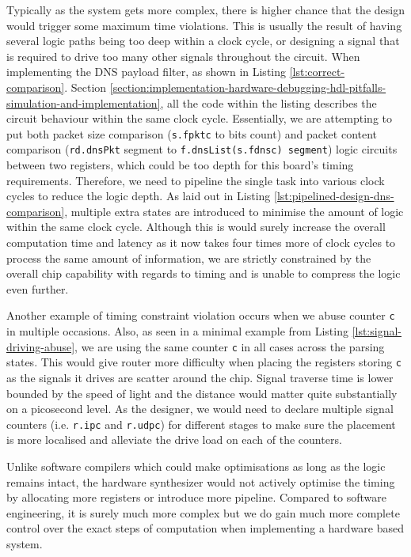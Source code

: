 \documentclass[a4paper]{report}
\newcommand{\code}{\texttt}
\begin{document}
Typically as the system gets more complex, there is higher chance that the design would trigger some maximum time violations. This is usually the result of having several logic paths being too deep within a clock cycle, or designing a signal that is required to drive too many other signals throughout the circuit. When implementing the DNS payload filter, as shown in Listing \ref{lst:correct-comparison}. Section \ref{section:implementation-hardware-debugging-hdl-pitfalls-simulation-and-implementation}, all the code within the listing describes the circuit behaviour within the same clock cycle. Essentially, we are attempting to put both packet size comparison (\code{s.fpktc} to bits count) and packet content comparison (\code{rd.dnsPkt} segment to \code{f.dnsList(s.fdnsc) segment}) logic circuits between two registers, which could be too depth for this board's timing requirements. Therefore, we need to pipeline the single task into various clock cycles to reduce the logic depth. As laid out in Listing \ref{lst:pipelined-design-dns-comparison}, multiple extra states are introduced to minimise the amount of logic within the same clock cycle. Although this is would surely increase the overall computation time and latency as it now takes four times more of clock cycles to process the same amount of information, we are strictly constrained by the overall chip capability with regards to timing and is unable to compress the logic even further.

Another example of timing constraint violation occurs when we abuse counter \code{c} in multiple occasions. Also, as seen in a minimal example from Listing \ref{lst:signal-driving-abuse}, we are using the same counter \code{c} in all cases across the parsing states. This would give router more difficulty when placing the registers storing \code{c} as the signals it drives are scatter around the chip. Signal traverse time is lower bounded by the speed of light and the distance would matter quite substantially on a picosecond level. As the designer, we would need to declare multiple signal counters (i.e. \code{r.ipc} and \code{r.udpc}) for different stages to make sure the placement is more localised and alleviate the drive load on each of the counters. 

Unlike software compilers which could make optimisations as long as the logic remains intact, the hardware synthesizer would not actively optimise the timing by allocating more registers or introduce more pipeline. Compared to software engineering, it is surely much more complex but we do gain much more complete control over the exact steps of computation when implementing a hardware based system.
\end{document}

